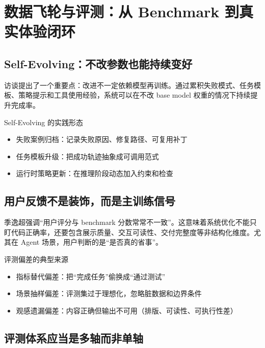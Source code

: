 \section{数据飞轮与评测：从 Benchmark 到真实体验闭环}

\subsection{Self-Evolving：不改参数也能持续变好}

访谈提出了一个重要点：改进不一定依赖模型再训练。通过累积失败模式、任务模板、策略提示和工具使用经验，系统可以在不改 base model 权重的情况下持续提升完成率。

\begin{knowledgebox}{Self-Evolving 的实践形态}
\begin{itemize}
    \item 失败案例归档：记录失败原因、修复路径、可复用补丁
    \item 任务模板升级：把成功轨迹抽象成可调用范式
    \item 运行时策略更新：在推理阶段动态加入约束和检查
\end{itemize}
\end{knowledgebox}

\subsection{用户反馈不是装饰，而是主训练信号}

季逸超强调“用户评分与 benchmark 分数常常不一致”。这意味着系统优化不能只盯代码正确率，还要包含展示质量、交互可读性、交付完整度等非结构化维度。尤其在 Agent 场景，用户判断的是“是否真的省事”。

\begin{warningbox}{评测偏差的典型来源}
\begin{itemize}
    \item 指标替代偏差：把“完成任务”偷换成“通过测试”
    \item 场景抽样偏差：评测集过于理想化，忽略脏数据和边界条件
    \item 观感遗漏偏差：内容正确但输出不可用（排版、可读性、可执行性差）
\end{itemize}
\end{warningbox}

\subsection{评测体系应当是多轴而非单轴}

